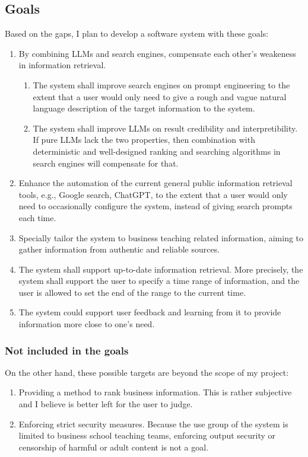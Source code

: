 \documentclass[final-report]{report-template}
\begin{document}
\subsection{Goals} \label{sec.intro.goals}
Based on the gaps, I plan to develop a software system with these goals:
\begin{enumerate}
	\item By combining LLMs and search engines, compensate each other's
		weakeness in information retrieval.
		\begin{enumerate}
		\item The system shall improve search engines on prompt engineering to
			the extent that a user would only need to give a rough and vague
			natural language description of the target information to the
			system.
		\item The system shall improve LLMs on result credibility and
			interpretibility. If pure LLMs lack the two properties, then
			combination with deterministic and well-designed ranking and
			searching algorithms in search engines will compensate for that.
		\end{enumerate}
	\item Enhance the automation of the current general public information
		retrieval tools, e.g., Google search, ChatGPT, to the extent that a
		user would only need to occasionally configure the system, instead of
		giving search prompts each time.
	\item Specially tailor the system to business teaching related information,
		aiming to gather information from authentic and reliable sources.
	\item The system shall support up-to-date information retrieval. More
		precisely, the system shall support the user to specify a time range of
		information, and the user is allowed to set the end of the range to the
		current time.
	\item The system could support user feedback and learning from it to
		provide information more close to one's need.
\end{enumerate}

\subsubsection{Not included in the goals}
On the other hand, these possible targets are beyond the scope of my project:
\begin{enumerate}
	\item Providing a method to rank business information. This is rather
		subjective and I believe is better left for the user to judge.
	\item Enforcing strict security measures. Because the use group of the
		system is limited to business school teaching teams, enforcing output
		security or censorship of harmful or adult content is not a goal.
\end{enumerate}
\end{document}
